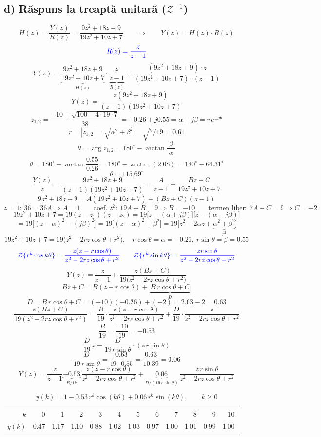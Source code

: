 \documentclass[10pt,a4paper]{article}
\begin{document}
\subsection*{d) Răspuns la treaptă unitară ($\mathcal Z^{-1}$)}
$$H(z)=\frac{Y(z)}{R(z)}=\frac{9z^2+18z+9}{19z^2+10z+7}\qquad\Rightarrow\qquad Y(z)=H(z)\cdot R(z)$$
$$\color{blue}R(z)=\frac{z}{z-1}$$
$$Y(z)=\underbrace{\frac{9z^2+18z+9}{19z^2+10z+7}}_{H(z)}\cdot\underbrace{\frac{z}{z-1}}_{R(z)}=\frac{(9z^2+18z+9)\cdot z}{(19z^2+10z+7)\cdot(z-1)}$$
$$Y(z)=\frac{z(9z^2+18z+9)}{(z-1)(19z^2+10z+7)}$$
$$z_{1,2}=\frac{-10\pm\sqrt{100-4\cdot19\cdot7}}{38}=-0.26\pm j0.55=\alpha\pm j\beta=r\,e^{\pm j\theta}$$
$$r=|z_{1,2}|=\sqrt{\alpha^2+\beta^2}=\sqrt{7/19}=0.61$$
$$\theta=\arg z_{1,2}=180^\circ-\arctan\frac{\beta}{|\alpha|}$$
$$\theta=180^\circ-\arctan\frac{0.55}{0.26}=180^\circ-\arctan(2.08)=180^\circ-64.31^\circ$$
$$\theta=115.69^\circ$$
$$\frac{Y(z)}z=\frac{9z^2+18z+9}{(z-1)(19z^2+10z+7)}=\frac{A}{z-1}+\frac{Bz+C}{19z^2+10z+7}$$
$$9z^2+18z+9=A(19z^2+10z+7)+(Bz+C)(z-1)$$
$$z=1:\ 36=36A\Rightarrow A=1\qquad \text{coef. }z^2:\ 19A+B=9\Rightarrow B=-10\qquad \text{termen liber}:\ 7A-C=9\Rightarrow C=-2$$
$$19z^2+10z+7=19(z-z_1)(z-z_2)=19\big[z-(\alpha{+}j\beta)\big]\big[z-(\alpha{-}j\beta)\big]$$
$$=19\big[(z-\alpha)^2-(j\beta)^2\big]=19\big[(z-\alpha)^2+\beta^2\big]=19\big[z^2-2\alpha z+\underbrace{\alpha^2+\beta^2}_{r^2}\big]$$
$$19z^2+10z+7=19\big(z^2-2rz\cos\theta+r^2\big),\quad r\cos\theta=\alpha=-0.26,\ r\sin\theta=\beta=0.55$$
$$\color{blue}\mathcal Z\{r^k\cos k\theta\}=\frac{z(z-r\cos\theta)}{z^2-2rz\cos\theta+r^2}\qquad \mathcal Z\{r^k\sin k\theta\}=\frac{zr\sin\theta}{z^2-2rz\cos\theta+r^2}$$
$$Y(z)=\frac{z}{z-1}+\frac{z(Bz+C)}{19\big(z^2-2rz\cos\theta+r^2\big)}$$
$$Bz+C=B(z-r\cos\theta)+\underbrace{\big[B\,r\cos\theta+C\big]}_{D}$$
$$D=B\,r\cos\theta+C=(-10)(-0.26)+(-2)=2.63-2=0.63$$
$$\frac{z(Bz+C)}{19(z^2-2rz\cos\theta+r^2)}=\frac{B}{19}\cdot\frac{z(z-r\cos\theta)}{z^2-2rz\cos\theta+r^2}+\frac{D}{19}\cdot\frac{z}{z^2-2rz\cos\theta+r^2}$$
$$\frac{B}{19}=\frac{-10}{19}=-0.53$$
$$\frac D{19}\,z=\frac{D}{19\,r\sin\theta}\cdot(z\,r\sin\theta)$$
$$\frac{D}{19\,r\sin\theta}=\frac{0.63}{19\cdot0.55}=\frac{0.63}{10.39}=0.06$$
$$Y(z)=\frac z{z-1}\underbrace{-0.53}_{B/19}\,\frac{z(z-r\cos\theta)}{z^2-2rz\cos\theta+r^2}+\underbrace{0.06}_{D/(19\,r\sin\theta)}\,\frac{z\,r\sin\theta}{z^2-2rz\cos\theta+r^2}$$
\begin{res}
$$y(k)=1-0.53\,r^k\cos(k\theta)+0.06\,r^k\sin(k\theta),\qquad k\ge0$$
\end{res}
\begin{center}
\begin{tabular}{@{}rrrrrrrrrrrr@{}}
$k$&0&1&2&3&4&5&6&7&8&9&10\\
$y(k)$&0.47&1.17&1.10&0.88&1.02&1.03&0.97&1.00&1.01&0.99&1.00\\
\end{tabular}
\end{center}
\end{document}
